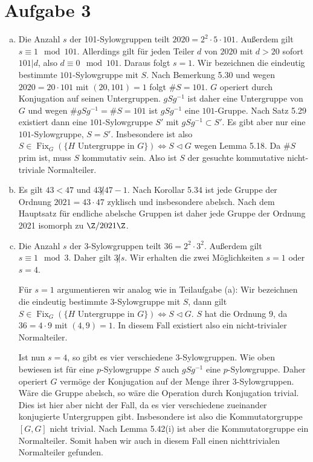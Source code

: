 \documentclass{article}
\begin{document}
\section*{Aufgabe 3}
\begin{enumerate}[(a)]
    \item Die Anzahl $s$ der 101-Sylowgruppen teilt $2020 = 2^2 \cdot 5 \cdot 101$. Außerdem gilt $s \equiv 1 \mod 101$.
    Allerdings gilt für jeden Teiler $d$ von $2020$ mit $d > 20$ sofort $101 | d$, also $d \equiv 0 \mod 101$.
    Daraus folgt $s = 1$. 
    Wir bezeichnen die eindeutig bestimmte $101$-Sylowgruppe mit $S$. Nach Bemerkung 5.30 und wegen $2020 = 20 \cdot 101$
    mit $(20, 101) = 1$ folgt $\# S = 101$.
    $G$ operiert durch Konjugation auf seinen Untergruppen.
    $gSg^{-1}$ ist daher eine Untergruppe von $G$ und wegen $\# gSg^{-1} = \# S = 101$ ist $gSg^{-1}$ eine $101$-Gruppe.
    Nach Satz 5.29 existiert dann eine $101$-Sylowgruppe $S'$ mit $gSg^{-1} \subset S'$.
    Es gibt aber nur eine $101$-Sylowgruppe, $S = S'$.
    Insbesondere ist also $S \in \operatorname{Fix}_G(\{H \text{ Untergruppe in } G\}) \Leftrightarrow S \triangleleft G$ 
    wegen Lemma 5.18. Da $\# S$ prim ist, muss $S$ kommutativ sein.
    Also ist $S$ der gesuchte kommutative nicht-triviale Normalteiler.
    \item Es gilt $43 < 47$ und $43 \not | 47-1$. Nach Korollar 5.34 ist jede Gruppe der Ordnung $2021 = 43\cdot 47$ zyklisch 
    und insbesondere abelsch. Nach dem Hauptsatz für endliche abelsche Gruppen ist daher jede Gruppe der Ordnung 2021
    isomorph zu $\Z/2021\Z$.
    \item Die Anzahl $s$ der $3$-Sylowgruppen teilt $36 = 2^2\cdot 3^2$. Außerdem gilt $s \equiv 1 \mod 3$.
    Daher gilt $3 \not | s$. Wir erhalten die zwei Möglichkeiten $s = 1$ oder $s = 4$. 

    Für $s = 1$ argumentieren wir analog wie
    in Teilaufgabe (a): Wir bezeichnen die eindeutig bestimmte $3$-Sylowgruppe mit $S$, dann gilt
    $S \in \operatorname{Fix}_G(\{H \text{ Untergruppe in } G\}) \Leftrightarrow S \triangleleft G$.
    $S$ hat die Ordnung $9$, da $36 = 4\cdot 9$ mit $(4,9) = 1$. In diesem Fall existiert also ein 
    nicht-trivialer Normalteiler.
    
    Ist nun $s = 4$, so gibt es vier verschiedene $3$-Sylowgruppen. 
    Wie oben bewiesen ist für eine $p$-Sylowgruppe $S$ auch $gSg^{-1}$ eine $p$-Sylowgruppe.
    Daher operiert $G$ vermöge der Konjugation auf der Menge ihrer $3$-Sylowgruppen.
    Wäre die Gruppe abelsch, so wäre die Operation durch Konjugation trivial.
    Dies ist hier aber nicht der Fall, da es vier verschiedene zueinander konjugierte Untergruppen gibt.
    Insbesondere ist also die Kommutatorgruppe $[G, G]$ nicht trivial.
    Nach Lemma 5.42(i) ist aber die Kommutatorgruppe ein Normalteiler.
    Somit haben wir auch in diesem Fall einen nichttrivialen Normalteiler gefunden.
\end{enumerate}
\end{document}
